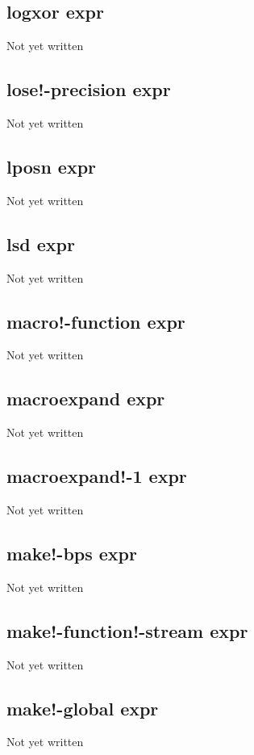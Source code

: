 \documentclass[a4paper,11pt]{article}
\begin{document}
{\subsection{\ttfamily logxor expr}
   Not yet written

\subsection{\ttfamily lose!-precision expr}
   Not yet written

\subsection{\ttfamily lposn expr}
   Not yet written

\subsection{\ttfamily lsd expr}
   Not yet written

\subsection{\ttfamily macro!-function expr}
   Not yet written

\subsection{\ttfamily macroexpand expr}
   Not yet written

\subsection{\ttfamily macroexpand!-1 expr}
   Not yet written

\subsection{\ttfamily make!-bps expr}
   Not yet written

\subsection{\ttfamily make!-function!-stream expr}
   Not yet written

\subsection{\ttfamily make!-global expr}
   Not yet written

}
\end{document}
